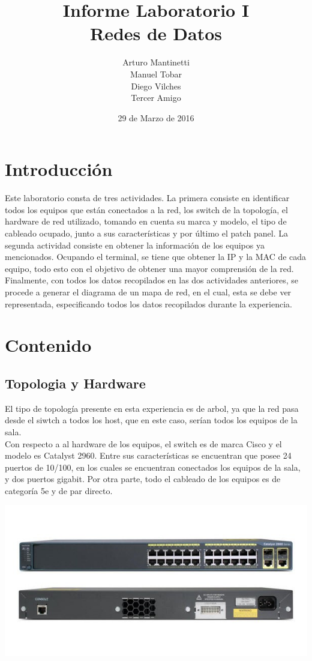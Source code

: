 ﻿\documentclass[spanish]{udpreport}
\title{Informe Laboratorio I \\ Redes de Datos}
\author{Arturo Mantinetti \\ Manuel Tobar \\ Diego Vilches \\ Tercer Amigo}
\date{29 de Marzo de 2016}
\begin{document}
\maketitle

\tableofcontents

\chapter{Introducción}

Este laboratorio consta de tres actividades. La primera consiste en identificar todos los equipos que están conectados a la red, los switch de la topología, el hardware de red utilizado, tomando en cuenta su marca y modelo, el tipo de cableado ocupado, junto a sus características y por último el patch panel. La segunda actividad consiste en obtener la información de los equipos ya mencionados. Ocupando el terminal, se tiene que obtener la IP y la MAC de cada equipo, todo esto con el objetivo de obtener una mayor comprensión de la red. Finalmente, con todos los datos recopilados en las dos actividades anteriores, se procede a generar el diagrama de un mapa de red, en el cual, esta se debe ver representada,  especificando todos los datos recopilados durante la experiencia.


\chapter{Contenido}

\section{Topologia y Hardware}
El tipo de topología presente en esta experiencia es de arbol, ya que la red pasa desde el siwtch a todos los host, que en este caso, serían todos los equipos de la sala.
\\
 
\setlength{\parindent}{0.5cm} Con respecto a al hardware de los equipos, el switch es de marca Cisco y el modelo es Catalyst 2960. Entre sus características se encuentran que posee 24 puertos de 10/100, en los cuales se encuentran conectados los equipos de la sala, y dos puertos gigabit. Por otra parte, todo el cableado de los equipos es de categoría 5e y de par directo.
\begin{center}
	\includegraphics[scale=.37]{images/switch.png}
\end{center}
  
\end{document}

